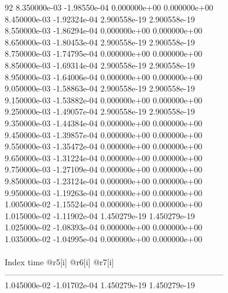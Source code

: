 92	8.350000e-03	-1.98550e-04	0.000000e+00	0.000000e+00	\\ 	8.450000e-03	-1.92324e-04	2.900558e-19	2.900558e-19	\\ 	8.550000e-03	-1.86294e-04	0.000000e+00	0.000000e+00	\\ 	8.650000e-03	-1.80453e-04	2.900558e-19	2.900558e-19	\\ 	8.750000e-03	-1.74795e-04	0.000000e+00	0.000000e+00	\\ 	8.850000e-03	-1.69314e-04	2.900558e-19	2.900558e-19	\\ 	8.950000e-03	-1.64006e-04	0.000000e+00	0.000000e+00	\\ 	9.050000e-03	-1.58863e-04	2.900558e-19	2.900558e-19	\\ 	9.150000e-03	-1.53882e-04	0.000000e+00	0.000000e+00	\\ 	9.250000e-03	-1.49057e-04	2.900558e-19	2.900558e-19	\\ 	9.350000e-03	-1.44384e-04	0.000000e+00	0.000000e+00	\\ 	9.450000e-03	-1.39857e-04	0.000000e+00	0.000000e+00	\\ 	9.550000e-03	-1.35472e-04	0.000000e+00	0.000000e+00	\\ 	9.650000e-03	-1.31224e-04	0.000000e+00	0.000000e+00	\\ 	9.750000e-03	-1.27109e-04	0.000000e+00	0.000000e+00	\\ 	9.850000e-03	-1.23124e-04	0.000000e+00	0.000000e+00	\\ 	9.950000e-03	-1.19263e-04	0.000000e+00	0.000000e+00	\\ 	1.005000e-02	-1.15524e-04	0.000000e+00	0.000000e+00	\\ 	1.015000e-02	-1.11902e-04	1.450279e-19	1.450279e-19	\\ 	1.025000e-02	-1.08393e-04	0.000000e+00	0.000000e+00	\\ 	1.035000e-02	-1.04995e-04	0.000000e+00	0.000000e+00	\\ \hline
\\ \hline
Index   time            @r5[i]          @r6[i]          @r7[i]          \\ \hline
--------------------------------------------------------------------------------\\ 	1.045000e-02	-1.01702e-04	1.450279e-19	1.450279e-19	\\ \hline
